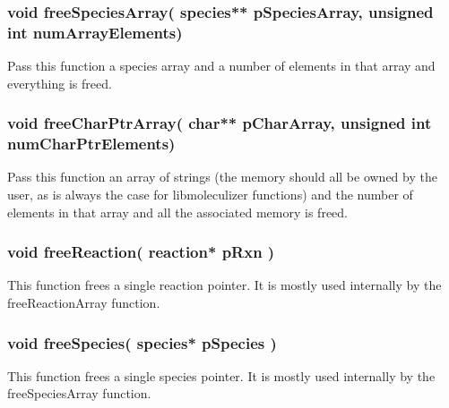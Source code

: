 \subsubsection{void freeSpeciesArray( species** pSpeciesArray,
  unsigned int numArrayElements)}
Pass this function a species array and a number of elements in that
array and everything is freed. 


\subsubsection{void freeCharPtrArray( char** pCharArray, unsigned int
  numCharPtrElements)}

Pass this function an array of strings (the memory should all be owned
by the user, as is always the case for libmoleculizer functions) and
the number of elements in that array and all the associated memory is
freed.  

\subsubsection{void freeReaction( reaction* pRxn )}
This function frees a single reaction pointer.  It is mostly used
internally by the freeReactionArray function.

\subsubsection{void freeSpecies( species* pSpecies )}
This function frees a single species pointer.  It is mostly used
internally by the freeSpeciesArray function.



